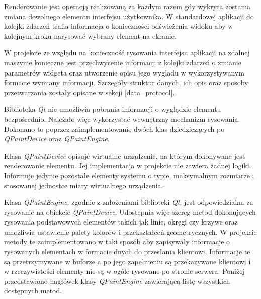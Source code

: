Renderowanie jest operacją realizowaną za każdym razem gdy wykryta zostania zmiana dowolnego elementu interfejsu użytkownika. W standardowej aplikacji do kolejki zdarzeń trafia informacja o konieczności odświeżenia widoku aby w kolejnym kroku narysować wybrany element na ekranie. 

W projekcie ze względu na konieczność rysowania interfejsu aplikacji na zdalnej maszynie konieczne jest przechwycenie informacji z kolejki zdarzeń o zmianie parametrów widgeta oraz utworzenie opisu jego wyglądu w wykorzystywanym formacie wymiany informacji. Szczegóły struktur danych, ich opis oraz sposoby przetwarzania zostały opisane w sekcji \ref{data_protocol}.

Biblioteka \emph{Qt} nie umożliwia pobrania informacji o wyglądzie elementu bezpośrednio. Należało więc wykorzystać wewnętrzny mechanizm rysowania. Dokonano to poprzez zaimplementowanie dwóch klas dziedziczących po \emph{QPaintDevice} oraz \emph{QPaintEngine}. 

Klasa \emph{QPaintDevice} opisuje wirtualne urządzenie, na którym dokonywane jest renderowanie elementu. Jej implementacja w projekcie nie zawiera żadnej logiki. Informuje jedynie pozostałe elementy systemu o typie, maksymalnym rozmiarze i stosowanej jednostce miary wirtualnego urządzenia. 

Klasa \emph{QPaintEngine}, zgodnie z założeniami biblioteki \emph{Qt}, jest odpowiedzialna za rysowanie na obiekcie \emph{QPaintDevice}. Udostępnia więc szereg metod dokonujących rysowania podstawowych elementów takich jak linie, okręgi czy krzywe oraz umożliwia ustawienie palety kolorów i przekształceń geometrycznych. W projekcie metody te zaimplementowano w taki sposób aby zapisywały informacje o rysowanych elementach w formacie dnych do przesłania klientowi. Informacje te są przetrzymywane w buforze a po jego zapełnieniu są przekazywane klientowi i w rzeczywistości elementy nie są w ogóle rysowane po stronie serwera. Poniżej przedstawiono nagłówek klasy \emph{QPaintEngine} zawierającą listę wszystkich dostępnych metod.

